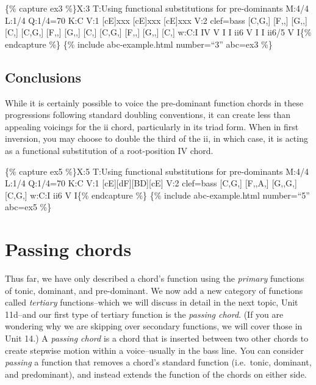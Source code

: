 \documentclass{book}
\begin{document}
\{\% capture ex3 \%\}X:3 T:Using functional substitutions for pre-dominants
M:4/4 L:1/4 Q:1/4=70 K:C V:1 {[}cE{]}xxx\textbar{}
{[}cE{]}xxx\textbar\textbar{} {[}cE{]}xxx\textbar{]} V:2 clef=bass {[}C,G,{]}
{[}F,,{]} {[}G,,{]} {[}C,{]}\textbar{} {[}C,G,{]} {[}F,,{]} {[}G,,{]}
{[}C,{]}\textbar{} {[}C,G,{]} {[}F,,{]} {[}G,,{]} {[}C,{]}\textbar{]} w:C:I IV
V I I ii6 V I I ii6/5 V I\{\% endcapture \%\} \{\% include abc-example.html
number=``3'' abc=ex3 \%\}

\hypertarget{conclusions-64}{%
\subsection{Conclusions}\label{conclusions-64}}

While it is certainly possible to voice the pre-dominant function chords in
these progressions following standard doubling conventions, it can create less
than appealing voicings for the ii chord, particularly in its triad form. When
in first inversion, you may choose to double the third of the ii, in which
case, it is acting as a functional substitution of a root-position IV chord.

\{\% capture ex5 \%\}X:5 T:Using functional substitutions for pre-dominants
M:4/4 L:1/4 Q:1/4=70 K:C V:1 {[}cE{]}{[}dF{]}{[}BD{]}{[}cE{]}\textbar{]} V:2
clef=bass {[}C,G,{]} {[}F,,A,{]} {[}G,,G,{]} {[}C,G,{]}\textbar{]} w:C:I ii6 V
I\{\% endcapture \%\} \{\% include abc-example.html number=``5'' abc=ex5 \%\}

\hypertarget{passing-chords}{%
\section{Passing chords}\label{passing-chords}}

Thus far, we have only described a chord's function using the \emph{primary}
functions of tonic, dominant, and pre-dominant. We now add a new category of
functions called \emph{tertiary} functions--which we will discuss in detail in
the next topic, Unit 11d--and our first type of tertiary function is the
\emph{passing chord}. (If you are wondering why we are skipping over secondary
functions, we will cover those in Unit 14.) A \emph{passing chord} is a chord
that is inserted between two other chords to create stepwise motion within a
voice--usually in the bass line. You can consider \emph{passing} a function
that removes a chord's standard function (i.e.~tonic, dominant, and
predominant), and instead extends the function of the chords on either side.
\end{document}
